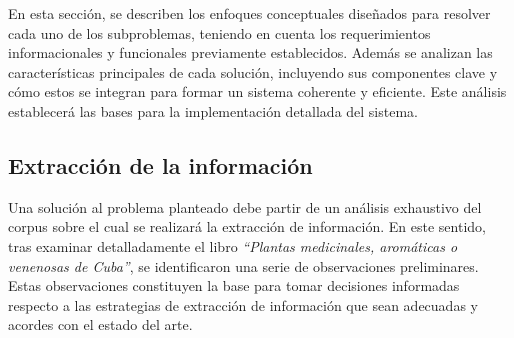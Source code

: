En esta sección, se describen los enfoques conceptuales diseñados para resolver cada 
uno de los subproblemas, teniendo en cuenta los requerimientos informacionales y funcionales previamente establecidos. 
Además se analizan las características principales de cada solución, incluyendo sus componentes clave y cómo 
estos se integran para formar un sistema coherente y eficiente. Este análisis establecerá las bases 
para la implementación detallada del sistema.


\subsection{Extracción de la información}\label{section:IE}
Una solución al problema planteado debe partir de un análisis exhaustivo del corpus sobre el cual se 
realizará la extracción de información. En este sentido, tras examinar detalladamente el libro 
\textit{``Plantas medicinales, aromáticas o venenosas de Cuba''}, se identificaron una serie de observaciones 
preliminares. Estas observaciones constituyen la base para tomar decisiones informadas respecto 
a las estrategias de extracción de información que sean adecuadas y acordes con el estado del arte.

